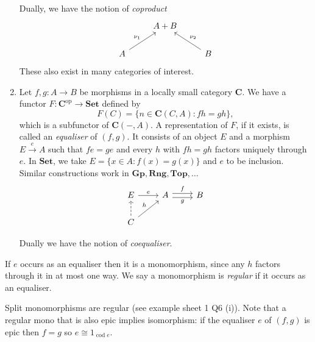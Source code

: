 \documentclass[a4paper]{article}
\renewcommand{\c}[1]{\mathbf{#1}}
\DeclareMathOperator{\cod}{cod}
\newcommand{\Set}{{\c{Set}}}
\newcommand{\Top}{{\c{Top}}}
\begin{document}
\begin{eg}
\begin{enumerate}
    Dually, we have the notion of \emph{coproduct}
    \[
      \begin{tikzcd}
        & A + B \\
        A \ar[ur, "\nu_1"] & & B \ar[ul, "\nu_2"']
      \end{tikzcd}
    \]
    These also exist in many categories of interest.
  \item Let \(f, g: A \to B\) be morphisms in a locally small category \(\c C\). We have a functor \(F: \c C^{\text{op}} \to \Set\) defined by
    \[
      F(C) = \{n \in \c C(C, A): fh = gh\},
    \]
    which is a subfunctor of \(\c C(-, A)\). A representation of \(F\), if it exists, is called an \emph{equaliser} of \((f, g)\). It consists of an object \(E\) and a morphism \(E \xrightarrow{e} A\) such that \(fe = ge\) and every \(h\) with \(fh = gh\) factors uniquely through \(e\). In \(\Set\), we take \(E = \{x \in A: f(x) = g(x)\}\) and \(e\) to be inclusion. Similar constructions work in \(\c{Gp}, \c{Rng}, \Top, \dots\)
    \[
      \begin{tikzcd}
        E \ar[r, "e"] & A \ar[r, "f", shift left] \ar[r, "g"', shift right] & B \\
        C \ar[u, dashed] \ar[ur, "h"]
      \end{tikzcd}
    \]

    Dually we have the notion of \emph{coequaliser}.
  \end{enumerate}
\end{eg}

\begin{remark}
  If \(e\) occurs as an equaliser then it is a monomorphism, since any \(h\) factors through it in at most one way. We say a monomorphism is \emph{regular} if it occurs as an equaliser.

  Split monomorphisms are regular (see example sheet 1 Q6 (i)). Note that a regular mono that is also epic implies isomorphism: if the equaliser \(e\) of \((f, g)\) is epic then \(f = g\) so \(e \cong 1_{\cod e}\).
\end{remark}

\end{document}
